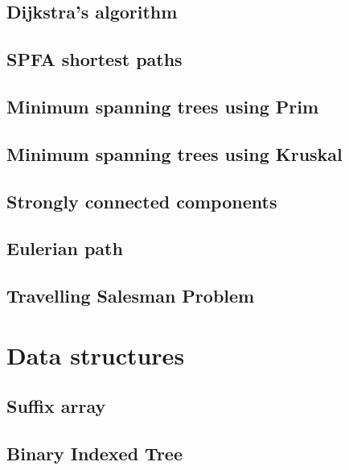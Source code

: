 \subsection{Dijkstra's algorithm}
\raggedbottom
\hrulefill
\subsection{SPFA shortest paths}
\raggedbottom
\hrulefill
\subsection{Minimum spanning trees using Prim}
\raggedbottom
\hrulefill
\subsection{Minimum spanning trees using Kruskal}
\raggedbottom
\hrulefill
\subsection{Strongly connected components}
\raggedbottom
\hrulefill
\subsection{Eulerian path}
\raggedbottom
\hrulefill
\subsection{Travelling Salesman Problem}
\raggedbottom
\hrulefill

\section{Data structures}
\subsection{Suffix array}
\raggedbottom
\hrulefill
\subsection{Binary Indexed Tree}
\raggedbottom
\hrulefill
